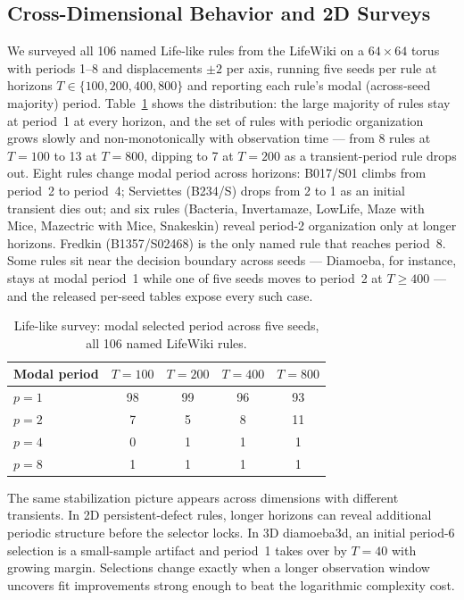\documentclass[letterpaper]{article}
\begin{document}
\subsection{Cross-Dimensional Behavior and 2D Surveys}

We surveyed all 106 named Life-like rules from the LifeWiki on a
$64 \times 64$ torus with periods 1--8 and displacements $\pm 2$ per axis,
running five seeds per rule at horizons $T \in \{100, 200, 400, 800\}$
and reporting each rule's modal (across-seed majority) period.
Table~\ref{tab:lifewiki} shows the distribution: the large majority of
rules stay at period~1 at every horizon, and the set of rules with
periodic organization grows slowly and non-monotonically with
observation time --- from 8 rules at $T=100$ to 13 at $T=800$, dipping
to 7 at $T=200$ as a transient-period rule drops out. Eight rules change modal period
across horizons: B017/S01 climbs from period~2 to period~4; Serviettes
(B234/S) drops from 2 to 1 as an initial transient dies out; and six
rules (Bacteria, Invertamaze, LowLife, Maze with Mice, Mazectric with
Mice, Snakeskin) reveal period-2 organization only at longer horizons.
Fredkin (B1357/S02468) is the only named rule that reaches period~8.
Some rules sit near the decision boundary across seeds --- Diamoeba,
for instance, stays at modal period~1 while one of five seeds moves to
period~2 at $T \geq 400$ --- and the released per-seed tables expose
every such case.

\begin{table}[t]
\centering
\caption{Life-like survey: modal selected period across five seeds, all
106 named LifeWiki rules.}
\label{tab:lifewiki}
\begin{tabular}{lcccc}
\toprule
Modal period & $T{=}100$ & $T{=}200$ & $T{=}400$ & $T{=}800$ \\
\midrule
$p=1$ & 98 & 99 & 96 & 93 \\
$p=2$ & 7 & 5 & 8 & 11 \\
$p=4$ & 0 & 1 & 1 & 1 \\
$p=8$ & 1 & 1 & 1 & 1 \\
\bottomrule
\end{tabular}
\end{table}

The same stabilization picture appears across dimensions with different
transients. In 2D persistent-defect rules, longer horizons can reveal
additional periodic structure before the selector locks. In 3D
diamoeba3d, an initial period-6 selection is a small-sample artifact and
period~1 takes over by $T=40$ with growing margin. Selections change
exactly when a longer observation window uncovers fit improvements
strong enough to beat the logarithmic complexity cost.
\end{document}
